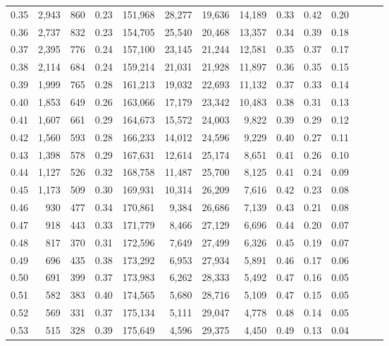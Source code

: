 \begin{tabular}{rrrrrrrrrrrrrr}
0.35 &  2,943 &    860 &  0.23 &  151,968 &   28,277 &  19,636 &  14,189 &  0.33 &  0.42 &      0.20 \\
0.36 &  2,737 &    832 &  0.23 &  154,705 &   25,540 &  20,468 &  13,357 &  0.34 &  0.39 &      0.18 \\
0.37 &  2,395 &    776 &  0.24 &  157,100 &   23,145 &  21,244 &  12,581 &  0.35 &  0.37 &      0.17 \\
0.38 &  2,114 &    684 &  0.24 &  159,214 &   21,031 &  21,928 &  11,897 &  0.36 &  0.35 &      0.15 \\
0.39 &  1,999 &    765 &  0.28 &  161,213 &   19,032 &  22,693 &  11,132 &  0.37 &  0.33 &      0.14 \\
0.40 &  1,853 &    649 &  0.26 &  163,066 &   17,179 &  23,342 &  10,483 &  0.38 &  0.31 &      0.13 \\
0.41 &  1,607 &    661 &  0.29 &  164,673 &   15,572 &  24,003 &   9,822 &  0.39 &  0.29 &      0.12 \\
0.42 &  1,560 &    593 &  0.28 &  166,233 &   14,012 &  24,596 &   9,229 &  0.40 &  0.27 &      0.11 \\
0.43 &  1,398 &    578 &  0.29 &  167,631 &   12,614 &  25,174 &   8,651 &  0.41 &  0.26 &      0.10 \\
0.44 &  1,127 &    526 &  0.32 &  168,758 &   11,487 &  25,700 &   8,125 &  0.41 &  0.24 &      0.09 \\
0.45 &  1,173 &    509 &  0.30 &  169,931 &   10,314 &  26,209 &   7,616 &  0.42 &  0.23 &      0.08 \\
0.46 &    930 &    477 &  0.34 &  170,861 &    9,384 &  26,686 &   7,139 &  0.43 &  0.21 &      0.08 \\
0.47 &    918 &    443 &  0.33 &  171,779 &    8,466 &  27,129 &   6,696 &  0.44 &  0.20 &      0.07 \\
0.48 &    817 &    370 &  0.31 &  172,596 &    7,649 &  27,499 &   6,326 &  0.45 &  0.19 &      0.07 \\
0.49 &    696 &    435 &  0.38 &  173,292 &    6,953 &  27,934 &   5,891 &  0.46 &  0.17 &      0.06 \\
0.50 &    691 &    399 &  0.37 &  173,983 &    6,262 &  28,333 &   5,492 &  0.47 &  0.16 &      0.05 \\
0.51 &    582 &    383 &  0.40 &  174,565 &    5,680 &  28,716 &   5,109 &  0.47 &  0.15 &      0.05 \\
0.52 &    569 &    331 &  0.37 &  175,134 &    5,111 &  29,047 &   4,778 &  0.48 &  0.14 &      0.05 \\
0.53 &    515 &    328 &  0.39 &  175,649 &    4,596 &  29,375 &   4,450 &  0.49 &  0.13 &      0.04 \\

\end{tabular}
